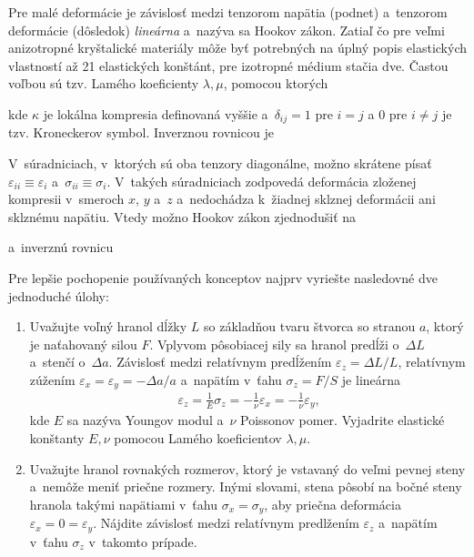 Pre malé deformácie je závislosť medzi tenzorom napätia (podnet) a~tenzorom deformácie (dôsledok) \emph{lineárna}
a~nazýva sa Hookov zákon. Zatiaľ čo pre veľmi anizotropné kryštalické materiály môže byť potrebných
na úplný popis elastických vlastností až 21 elastických konštánt, pre izotropné médium stačia dve.
Častou voľbou sú tzv. Lamého koeficienty $\lambda,\mu$, pomocou ktorých


kde $\kappa$ je lokálna kompresia definovaná vyššie a~$\delta_{ij}=1$ pre $i=j$ a $0$ pre $i\neq j$
je tzv. Kroneckerov symbol. Inverznou rovnicou je 


V~súradniciach, v~ktorých sú oba tenzory diagonálne, možno skrátene písať $\varepsilon_{ii}\equiv \varepsilon_{i}$
a~$\sigma_{ii}\equiv \sigma_{i}$. V~takých súradniciach zodpovedá deformácia zloženej kompresii v~smeroch
$x$, $y$ a~$z$ a~nedochádza k~žiadnej sklznej deformácii ani sklznému napätiu.
Vtedy možno Hookov zákon zjednodušiť na 


a~inverznú rovnicu


Pre lepšie pochopenie používaných konceptov najprv vyriešte nasledovné dve jednoduché úlohy:
\begin{enumerate}[label=\alph*)]
	\item Uvažujte voľný hranol dĺžky $L$ so základňou tvaru štvorca so stranou $a$, ktorý je naťahovaný silou $F$.
	Vplyvom pôsobiacej sily sa hranol predĺži o~$\Delta L$ a~stenčí o~$\Delta a$. Závislosť medzi
	relatívnym predĺžením $\varepsilon_z=\Delta L / L$, relatívnym zúžením
	$\varepsilon_x = \varepsilon_y = -\Delta a/a $ a~napätím v~ťahu $\sigma_z = F/S$ je lineárna
	\begin{eqnarray}
		\varepsilon_z = \frac{1}{E} \sigma_z = -\frac{1}{\nu} \varepsilon_x = -\frac{1}{\nu} \varepsilon_y\text{,}
	\end{eqnarray}
	kde $E$ sa nazýva Youngov modul a~$\nu$ Poissonov pomer. Vyjadrite elastické konštanty
	$E,\nu$ pomocou Lamého koeficientov $\lambda,\mu$.

	\item Uvažujte hranol rovnakých rozmerov, ktorý je vstavaný do veľmi pevnej steny a~nemôže meniť priečne
		rozmery. Inými slovami, stena pôsobí na bočné steny hranola takými napätiami v~ťahu $\sigma_x=\sigma_y$,
		aby priečna deformácia $\varepsilon_x = 0 = \varepsilon_y$. Nájdite závislosť medzi relatívnym predlžením
		$\varepsilon_z$ a~napätím v~ťahu $\sigma_z$ v~takomto prípade.
\end{enumerate}

